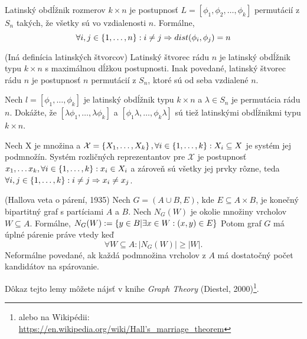 \begin{definition}
Latinský obdĺžnik rozmerov $k \times n$ je postupnosť $L = [\phi_1, \phi_2, \ldots, \phi_k]$ permutácií z $S_n$ takých, že všetky sú vo vzdialenosti $n$. 
Formálne, 
$$\forall i, j \in \left\{1, \ldots, n\right\}: i \neq j \Rightarrow dist(\phi_i, \phi_j) = n$$
\end{definition}

\begin{definition}{(Iná definícia latinských štvorcov)}
Latinský štvorec rádu $n$ je latinský obdĺžnik typu $k \times n$ s maximálnou dĺžkou postupnosti. 
Inak povedané, latinský štvorec rádu $n$ je postupnosť $n$ permutácií z $S_n$, ktoré sú od seba vzdialené $n$.
\end{definition}

\begin{toreview}
\begin{exercise}
Nech $l = [\phi_1, \ldots, \phi_k]$ je latinský obdĺžnik typu $k \times n$ a $\lambda \in S_n$ je permutácia rádu $n$.
Dokážte, že $[\lambda \phi_1, \ldots, \lambda \phi_k]$ a $[\phi_1 \lambda, \ldots, \phi_k \lambda]$ sú tiež latinskými obdĺžnikmi typu $k \times n$.
\end{exercise}
\end{toreview}

\begin{definition}
Nech X je množina a $\mathcal{X} = \left\{X_1, \ldots, X_k\right\}, \forall i \in \left\{1, \ldots, k\right\}: X_i \subseteq X$ je systém jej podmnožín.
Systém rozličných reprezentantov pre $\mathcal{X}$ je postupnosť $x_1, \ldots x_k, \forall i \in \left\{1, \ldots, k\right\}: x_i \in X_i$ 
a zároveň sú všetky jej prvky rôzne, teda $\forall i, j \in \left\{1, \ldots, k\right\}: i \neq j \Rightarrow  x_i \neq x_j$.
\end{definition}

\begin{lemma}{(Hallova veta o párení, 1935)}
Nech $G = (A \cup B, E)$, kde $E \subseteq A \times B$, je konečný bipartitný graf s partíciami $A$ a $B$.
Nech $N_G(W)$ je okolie množiny vrcholov $W \subseteq A$.
Formálne, $N_G(W) := \left\{y \in B| \exists x \in W: (x, y) \in E\right\} $
Potom graf $G$ má úplné párenie práve vtedy keď $$\forall W \subseteq A: |N_G(W)| \geq |W|.$$
Neformálne povedané, ak každá podmnožina vrcholov z $A$ má dostatočný počet kandidátov na spárovanie.
\end{lemma}
Dôkaz tejto lemy môžete nájsť v knihe \emph{Graph Theory} (Diestel, 2000)\footnote{alebo na Wikipédii: \href{https://en.wikipedia.org/wiki/Hall\%27s_marriage_theorem}{https://en.wikipedia.org/wiki/Hall's\_marriage\_theorem}}.

